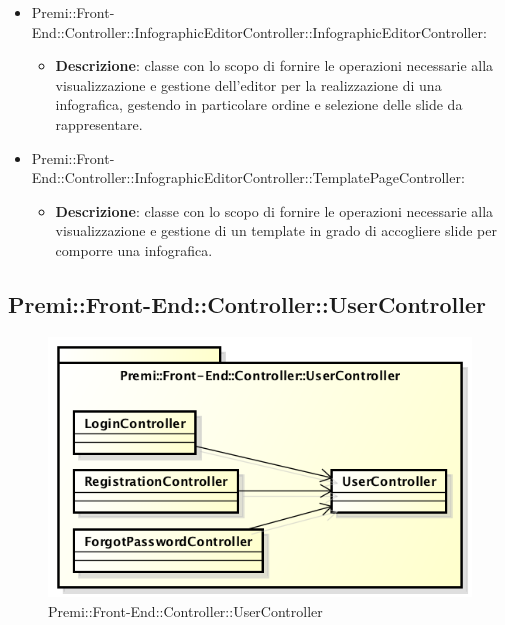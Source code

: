 	\begin{itemize}
		 \item Premi::Front-End::Controller::InfographicEditorController::InfographicEditorController:
			\begin{itemize}
				\item \textbf{Descrizione}: classe con lo scopo di fornire le operazioni necessarie alla visualizzazione e gestione dell'editor per la realizzazione di una \gls{infografica}, gestendo in particolare ordine e selezione delle \gls{slide} da rappresentare.
			\end{itemize}
		\item  Premi::Front-End::Controller::InfographicEditorController::TemplatePageController: 
			 \begin{itemize}
				\item \textbf{Descrizione}: classe con lo scopo di fornire le operazioni necessarie alla visualizzazione e gestione di un \gls{template} in grado di accogliere \gls{slide} per comporre una \gls{infografica}.
			\end{itemize}
	\end{itemize}
	
\subsection{Premi::Front-End::Controller::UserController}
\begin{figure}[h]
\centering
\includegraphics[width=0.7\linewidth]{img/front-end_controller_usercontroller}
\caption[Premi::Front-End::Controller::UserController]{Premi::Front-End::Controller::UserController}
\label{fig:front-end_controller_usercontroller}
\end{figure}

